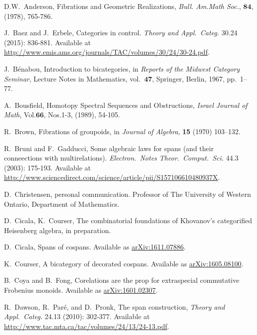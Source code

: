 \documentclass[11pt]{amsart}
\newcommand{\cat}[1]{\mathbf{#1}}
\theoremstyle{remark}
\theoremstyle{definition}
\begin{document}
%
\begin{thebibliography}{100}
D.W.\ Anderson,
Fibrations and Geometric Realizations,
\emph{Bull. Am.Math Soc.}, $\mathbf{84}$, (1978), 765-786.

J.~Baez and J.~Erbele,
Categories in control.
\emph{Theory and Appl.~Categ.} 
30.24 (2015): 836-881.
Available at \href{http://www.emis.ams.org/journals/TAC/volumes/30/24/30-24.pdf}{http://www.emis.ams.org/journals/TAC/volumes/30/24/30-24.pdf}.

J.~B\'enabou, 
Introduction to bicategories, 
in \emph{Reports of the Midwest Category Seminar}, 
Lecture Notes in Mathematics, 
vol.\ $\cat{47}$, 
Springer, Berlin, 1967, pp.\ 1--77. 

A.\ Bousfield,
Homotopy Spectral Sequences and Obstructions,
\emph{Israel Journal of Math},
Vol.$\mathbf{66}$, Nos.1-3, (1989), 54-105.

R.\ Brown,
Fibrations of groupoids,
in \emph{Journal of Algebra},
\textbf{15} (1970) 103--132.

R.~Bruni and F.~Gadducci,
Some algebraic laws for spans (and their conneections with multirelations).
\emph{Electron.~Notes Theor.~Comput.~Sci.}
44.3 (2003): 175-193.
Available at \href{http://www.sciencedirect.com/science/article/pii/S157106610480937X}{http://www.sciencedirect.com/science/article/pii/S157106610480937X}.

D.~Christensen, personal communication. Professor of The University of Western Ontario, Department of Mathematics.

D.~Cicala, K.~Courser,
The combinatorial foundations of Khovanov's categorified Heisenberg algebra, in preparation.

D.~Cicala, 
Spans of cospans.
Available as \href{https://arxiv.org/abs/1611.07886}{arXiv:1611.07886}.

K.~Courser, 
A bicategory of decorated cospans. 
Available as \href{https://arxiv.org/pdf/1605.08100v2.pdf}{arXiv:1605.08100}.

B.~Coya and B.~Fong,
Corelations are the prop for extraspecial commutative Frobenius monoids.
Available as \href{https://arxiv.org/abs/1601.02307}{arXiv:1601.02307}.

R.~Dawson, R.~Par\'{e}, and D.~Pronk, 
The span construction, 
\emph{Theory and Appl.~Categ.} 
24.13 (2010): 302-377.
Available at \href{http://www.tac.mta.ca/tac/volumes/24/13/24-13.pdf}{http://www.tac.mta.ca/tac/volumes/24/13/24-13.pdf}.


\end{thebibliography}
\end{document}
